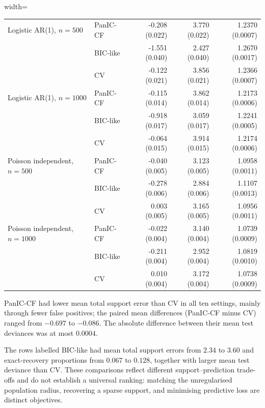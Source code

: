 \documentclass[12pt]{article}
\newenvironment{bluechange}{\begingroup\color[rgb]{0.00,0.00,1.00}}{\endgroup}
\theoremstyle{remark}
\theoremstyle{plain}
\begin{document}
\begin{bluechange}
\begin{table}[H]
\begin{adjustbox}{width=\textwidth}
\begin{tabular}{llrrr}
Logistic AR(1), $n=500$ & PanIC-CF & -0.208 (0.022) & 3.770 (0.022) & 1.2370 (0.0007) \\
 & BIC-like & -1.551 (0.040) & 2.427 (0.040) & 1.2670 (0.0017) \\
 & CV & -0.122 (0.021) & 3.856 (0.021) & 1.2366 (0.0007) \\
Logistic AR(1), $n=1000$ & PanIC-CF & -0.115 (0.014) & 3.862 (0.014) & 1.2173 (0.0006) \\
 & BIC-like & -0.918 (0.017) & 3.059 (0.017) & 1.2241 (0.0005) \\
 & CV & -0.064 (0.015) & 3.914 (0.015) & 1.2174 (0.0006) \\
Poisson independent, $n=500$ & PanIC-CF & -0.040 (0.005) & 3.123 (0.005) & 1.0958 (0.0011) \\
 & BIC-like & -0.278 (0.006) & 2.884 (0.006) & 1.1107 (0.0013) \\
 & CV & 0.003 (0.005) & 3.165 (0.005) & 1.0956 (0.0011) \\
Poisson independent, $n=1000$ & PanIC-CF & -0.022 (0.004) & 3.140 (0.004) & 1.0739 (0.0009) \\
 & BIC-like & -0.211 (0.004) & 2.952 (0.004) & 1.0819 (0.0010) \\
 & CV & 0.010 (0.004) & 3.172 (0.004) & 1.0738 (0.0009) \\
\hline
\end{tabular}
\end{adjustbox}
\end{table}


PanIC-CF had lower mean total support error than CV in all ten settings, mainly through fewer false positives; the paired mean differences (PanIC-CF minus CV) ranged from $-0.697$ to $-0.086$. The absolute difference between their mean test deviances was at most $0.0004$.


The rows labelled BIC-like had mean total support errors from $2.34$ to $3.60$ and exact-recovery proportions from $0.067$ to $0.128$, together with larger mean test deviance than CV. These comparisons reflect different support--prediction trade-offs and do not establish a universal ranking: matching the unregularised population radius, recovering a sparse support, and minimising predictive loss are distinct objectives.
\end{bluechange}
\end{document}
